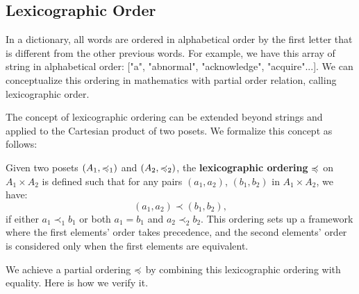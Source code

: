 \subsection{Lexicographic Order}
In a dictionary, all words are ordered in alphabetical order by the first letter that is different from the other previous words. For example, we have this array of string in alphabetical order: ["a", "abnormal", "acknowledge", "acquire"...]. We can conceptualize this ordering in mathematics with partial order relation, calling lexicographic order. 

The concept of lexicographic ordering can be extended beyond strings and applied to the Cartesian product of two posets. We formalize this concept as follows:
\begin{definition}\label{lexord}
	Given two posets \( (A_1, \preccurlyeq_1) \) and \( (A_2, \preccurlyeq_2) \), the \textbf{lexicographic ordering} \( \preccurlyeq \) on \( A_1 \times A_2 \) is defined such that for any pairs \( (a_1, a_2) \), \( (b_1, b_2) \) in \( A_1 \times A_2 \), we have:
	\[
	(a_1, a_2) \prec (b_1, b_2),
	\]
	if either \( a_1 \prec_1 b_1 \) or both \( a_1 = b_1 \) and \( a_2 \prec_2 b_2 \). This ordering sets up a framework where the first elements' order takes precedence, and the second elements' order is considered only when the first elements are equivalent.
\end{definition}
We achieve a partial ordering \( \preccurlyeq \) by combining this lexicographic ordering with equality. 
Here is how we verify it.

